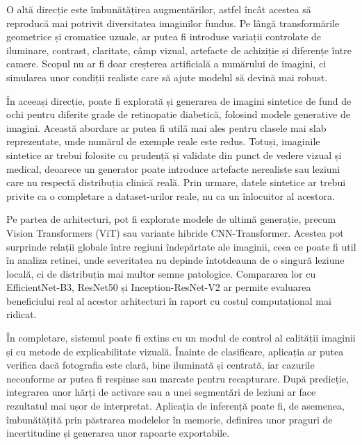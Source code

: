\documentclass[12pt, a4paper, twoside, romanian]{teza-upb}
\begin{document}
O altă direcție este îmbunătățirea augmentărilor, astfel încât acestea să reproducă mai potrivit
diversitatea imaginilor fundus. Pe lângă transformările geometrice și cromatice uzuale, ar putea fi
introduse variații controlate de iluminare, contrast, claritate, câmp vizual, artefacte de achiziție și
diferențe între camere. Scopul nu ar fi doar creșterea artificială a numărului de imagini, ci simularea
unor condiții realiste care să ajute modelul să devină mai robust.
\bigskip

În aceeași direcție, poate fi explorată și generarea de imagini sintetice de fund de ochi pentru
diferite grade de retinopatie diabetică, folosind modele generative de imagini. Această abordare ar
putea fi utilă mai ales pentru clasele mai slab reprezentate, unde numărul de exemple reale este redus.
Totuși, imaginile sintetice ar trebui folosite cu prudență și validate din punct de vedere vizual și
medical, deoarece un generator poate introduce artefacte nerealiste sau leziuni care nu respectă
distribuția clinică reală. Prin urmare, datele sintetice ar trebui privite ca o completare a
dataset-urilor reale, nu ca un înlocuitor al acestora.
\bigskip

Pe partea de arhitecturi, pot fi explorate modele de ultimă generație, precum Vision Transformers
(ViT) sau variante hibride CNN-Transformer. Acestea pot surprinde relații globale între regiuni
îndepărtate ale imaginii, ceea ce poate fi util în analiza retinei, unde severitatea nu depinde
întotdeauna de o singură leziune locală, ci de distribuția mai multor semne patologice. Compararea lor
cu EfficientNet-B3, ResNet50 și Inception-ResNet-V2 ar permite evaluarea beneficiului real al acestor
arhitecturi în raport cu costul computațional mai ridicat.
\bigskip

În completare, sistemul poate fi extins cu un modul de control al calității imaginii și cu metode de
explicabilitate vizuală. Înainte de clasificare, aplicația ar putea verifica dacă fotografia este clară,
bine iluminată și centrată, iar cazurile neconforme ar putea fi respinse sau marcate pentru
recapturare. După predicție, integrarea unor hărți de activare sau a unei segmentări de leziuni ar face
rezultatul mai ușor de interpretat. Aplicația de inferență poate fi, de asemenea, îmbunătățită prin
păstrarea modelelor în memorie, definirea unor praguri de incertitudine și generarea unor rapoarte
exportabile.

\newpage
\mbox{}
\newpage

\appendix


\end{document}

